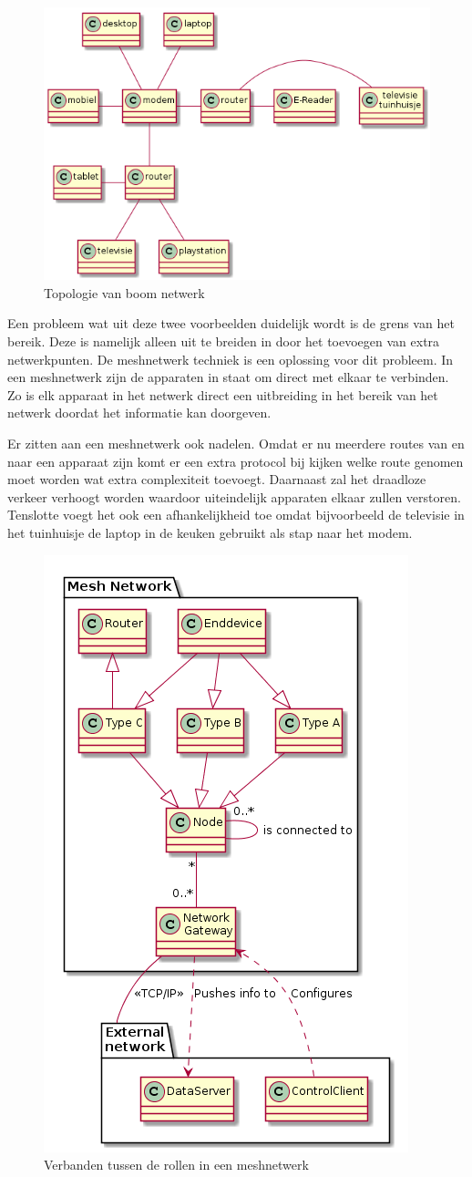 \documentclass[a4paper, 11pt, oneside]{report}
\begin{document}
\begin{figure}[H]
	\begin{center}\includegraphics[width=.5\linewidth]{treeTopo}\end{center}
	\caption{Topologie van boom netwerk}
	\label{fig:toplogieboom}
\end{figure}

Een probleem wat uit deze twee voorbeelden duidelijk wordt is de grens van het bereik. 
Deze is namelijk alleen uit te breiden in door het toevoegen van extra netwerkpunten.
De meshnetwerk techniek is een oplossing voor dit probleem.
In een meshnetwerk zijn de apparaten in staat om direct met elkaar te verbinden. 
Zo is elk apparaat in het netwerk direct een uitbreiding in het bereik van het netwerk doordat het informatie kan doorgeven.

Er zitten aan een meshnetwerk ook nadelen.
Omdat er nu meerdere routes van en naar een apparaat zijn komt er een extra protocol bij kijken welke route genomen moet worden wat extra complexiteit toevoegt.
Daarnaast zal het draadloze verkeer verhoogt worden waardoor uiteindelijk apparaten elkaar zullen verstoren.
Tenslotte voegt het ook een afhankelijkheid toe omdat bijvoorbeeld de televisie in het tuinhuisje de laptop in de keuken gebruikt als stap naar het modem.

\begin{figure}[H]
	\begin{center}\includegraphics[width=.3\linewidth]{meshclass}\end{center}
	\caption{Verbanden tussen de rollen in een meshnetwerk}
	\label{fig:meshrol}
\end{figure}
\end{document}
